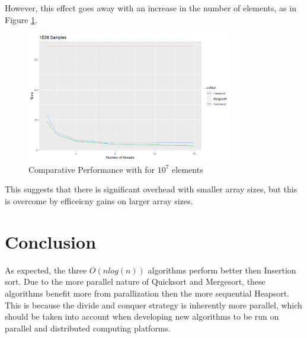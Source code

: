 \documentclass[conference]{IEEEtran}
\begin{document}
However, this effect goes away with an increase in the number of elements, as in Figure \ref{1e8}. 
\begin{figure}[h]
	\includegraphics[width=9cm]{1e8.png} 
	\caption{Comparative Performance with for $10^7$ elements}
	\label{1e8}
\end{figure}

This suggests that there is significant overhead with smaller array sizes, but this is overcome by efficeicny gains on larger array sizes. 
\section{Conclusion}
As expected, the three $O(n log(n))$ algorithms perform better then Insertion sort. 
Due to the more parallel nature of Quicksort and Mergesort, these algorithms benefit more from parallization then the more sequential Heapsort. 
This is because the divide and conquer strategy is inherently more parallel, which should be taken into account when developing new algorithms to be run on parallel and distributed computing platforms. 


\appendix
\end{document}
